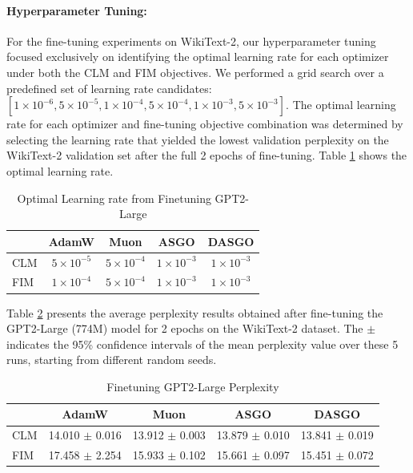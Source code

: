 \documentclass{article}
\theoremstyle{remark}
\begin{document}
\paragraph{Hyperparameter Tuning:}
For the fine-tuning experiments on WikiText-2, our hyperparameter tuning focused exclusively on identifying the optimal learning rate for each optimizer under both the CLM and FIM objectives. We performed a grid search over a predefined set of learning rate candidates: $[1 \times 10^{-6}, 5\times 10^{-5}, 1\times 10^{-4}, 5\times 10^{-4}, 1\times 10^{-3}, 5\times 10^{-3}]$. The optimal learning rate for each optimizer and fine-tuning objective combination was determined by selecting the learning rate that yielded the lowest validation perplexity on the WikiText-2 validation set after the full 2 epochs of fine-tuning. Table \ref{table:finetune_optimal_lr} shows the optimal learning rate.
\begin{table}[h!]
    \centering
    \caption{Optimal Learning rate from Finetuning GPT2-Large}
    \begin{tabular}{l|cccc}
        \toprule
        & AdamW & Muon & ASGO & DASGO \\
        \midrule
        CLM & $5\times 10^{-5}$ & $5 \times 10^{-4}$ & $1 \times 10^{-3}$ & $1 \times 10^{-3}$ \\
        FIM & $1 \times 10^{-4}$ & $5 \times 10^{-4}$ & $1 \times 10^{-3}$ & $1 \times 10^{-3}$ \\
        \bottomrule
    \end{tabular}
    \label{table:finetune_optimal_lr}
\end{table}

Table \ref{table:Full Finetune Result} presents the average perplexity results obtained after fine-tuning the GPT2-Large (774M) model for 2 epochs on the WikiText-2 dataset. The $\pm$ indicates the 95\% confidence intervals of the mean perplexity value over these 5 runs, starting from different random seeds.
\begin{table}[h]
    \centering
    \caption{Finetuning GPT2-Large Perplexity}
    \begin{tabular}{l|cccc}
        \toprule
        & AdamW & Muon & ASGO & DASGO \\
        \midrule
        CLM  & 14.010 $\pm$ 0.016 & 13.912 $\pm$ 0.003 & 13.879 $\pm$ 0.010 & 13.841 $\pm$ 0.019 \\
        FIM  & 17.458 $\pm$ 2.254 & 15.933 $\pm$ 0.102 & 15.661 $\pm$ 0.097 & 15.451 $\pm$ 0.072 \\
        \bottomrule
    \end{tabular}
    \label{table:Full Finetune Result}
\end{table}
\end{document}
